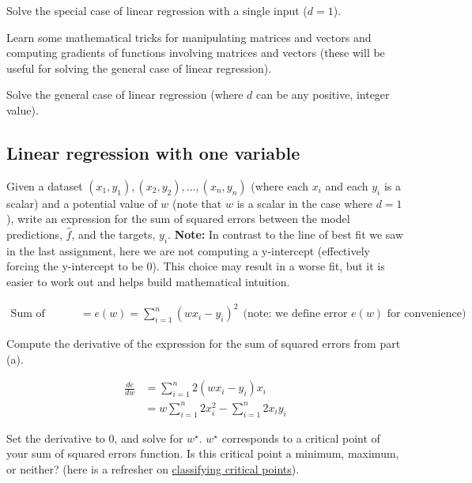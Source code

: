 \documentclass[assignment02_Solutions]{subfiles}
\begin{document}
\be
\item Solve the special case of linear regression with a single input ($d=1$).
\item Learn some mathematical tricks for manipulating matrices and vectors and computing gradients of functions involving matrices and vectors (these will be useful for solving the general case of linear regression).
\item Solve the general case of linear regression (where $d$ can be any positive, integer value).
\ee

\subsection{Linear regression with one variable}

\begin{exercise}[(20 minutes)]
\bes
\item Given a dataset $(x_1, y_1), (x_2, y_2), \ldots, (x_n, y_n)$ (where each $x_i$ and each $y_i$ is a scalar) and a potential value of $w$ (note that $w$ is a scalar in the case where $d=1$), write an expression for the sum of squared errors between the model predictions, $\hat{f}$, and the targets, $y_i$.  \textbf{Note:} In contrast to the line of best fit we saw in the last assignment, here we are not computing a y-intercept (effectively forcing the y-intercept to be $0$).  This choice may result in a worse fit, but it is easier to work out and helps build mathematical intuition.

\begin{boxedsolution}
\begin{align}
\mbox{Sum of Squared Errors} &= e(w) = \sum_{i=1}^n \left (  w x_i - y_i \right)^2~~\mbox{(note: we define error $e(w)$ for convenience)}
\end{align}
\end{boxedsolution}

\item Compute the derivative of the expression for the sum of squared errors from part (a).

\begin{boxedsolution}
\begin{align}
\frac{de}{dw} & = \sum_{i=1}^n 2 \left (  w x_i - y_i \right)x_i  \\
&= w \sum_{i=1}^n 2 x_i^2 - \sum_{i=1}^n 2 x_i y_i
\end{align}
\end{boxedsolution}

\item Set the derivative to 0, and solve for $w^\star$.  $w^\star$ corresponds to a critical point of your sum of squared errors function.  Is this critical point a minimum, maximum, or neither? (here is a refresher on \href{http://homes.sice.indiana.edu/donbyrd/Teach/M119WebPage/Finding+ClassifyingCriticalPoints.pdf}{classifying critical points}).
 

\end{exercise}
\end{document}
